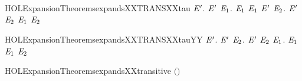 \newcommand{\HOLExpansionTheoremsexpandsXXTRANSXXlabelYY}{\UseVerbatim{HOLExpansionTheoremsexpandsXXTRANSXXlabelYY}}
\begin{SaveVerbatim}{HOLExpansionTheoremsexpandsXXTRANSXXtau}
\HOLTokenTurnstile{} \HOLSymConst{\HOLTokenForall{}} \ensuremath{\HOLBoundVar{E}\sp{\prime}}.
         \ensuremath{\HOLBoundVar{E}\sp{\prime}} \HOLSymConst{\HOLTokenImp{}}
       \HOLSymConst{\HOLTokenForall{}}\ensuremath{\HOLBoundVar{E}\sb{\mathrm{1}}}.
            \HOLTokenTransBegin\HOLConst{\ensuremath{\tau}}\HOLTokenTransEnd \ensuremath{\HOLBoundVar{E}\sb{\mathrm{1}}} \HOLSymConst{\HOLTokenImp{}}
           \ensuremath{\HOLBoundVar{E}\sb{\mathrm{1}}}  \ensuremath{\HOLBoundVar{E}\sp{\prime}} \HOLSymConst{\HOLTokenDisj{}} \HOLSymConst{\HOLTokenExists{}}\ensuremath{\HOLBoundVar{E}\sb{\mathrm{2}}}. \ensuremath{\HOLBoundVar{E}\sp{\prime}} \HOLTokenTransBegin\HOLConst{\ensuremath{\tau}}\HOLTokenTransEnd \ensuremath{\HOLBoundVar{E}\sb{\mathrm{2}}} \HOLSymConst{\HOLTokenConj{}} \ensuremath{\HOLBoundVar{E}\sb{\mathrm{1}}}  \ensuremath{\HOLBoundVar{E}\sb{\mathrm{2}}}
\end{SaveVerbatim}
\newcommand{\HOLExpansionTheoremsexpandsXXTRANSXXtau}{\UseVerbatim{HOLExpansionTheoremsexpandsXXTRANSXXtau}}
\begin{SaveVerbatim}{HOLExpansionTheoremsexpandsXXTRANSXXtauYY}
\HOLTokenTurnstile{} \HOLSymConst{\HOLTokenForall{}} \ensuremath{\HOLBoundVar{E}\sp{\prime}}.
         \ensuremath{\HOLBoundVar{E}\sp{\prime}} \HOLSymConst{\HOLTokenImp{}}
       \HOLSymConst{\HOLTokenForall{}}\ensuremath{\HOLBoundVar{E}\sb{\mathrm{2}}}. \ensuremath{\HOLBoundVar{E}\sp{\prime}} \HOLTokenTransBegin\HOLConst{\ensuremath{\tau}}\HOLTokenTransEnd \ensuremath{\HOLBoundVar{E}\sb{\mathrm{2}}} \HOLSymConst{\HOLTokenImp{}} \HOLSymConst{\HOLTokenExists{}}\ensuremath{\HOLBoundVar{E}\sb{\mathrm{1}}}.  \HOLTokenWeakTransBegin\HOLConst{\ensuremath{\tau}}\HOLTokenWeakTransEnd \ensuremath{\HOLBoundVar{E}\sb{\mathrm{1}}} \HOLSymConst{\HOLTokenConj{}} \ensuremath{\HOLBoundVar{E}\sb{\mathrm{1}}}  \ensuremath{\HOLBoundVar{E}\sb{\mathrm{2}}}
\end{SaveVerbatim}
\newcommand{\HOLExpansionTheoremsexpandsXXTRANSXXtauYY}{\UseVerbatim{HOLExpansionTheoremsexpandsXXTRANSXXtauYY}}
\begin{SaveVerbatim}{HOLExpansionTheoremsexpandsXXtransitive}
\HOLTokenTurnstile{}  \ensuremath{(}\ensuremath{)}
\end{SaveVerbatim}
